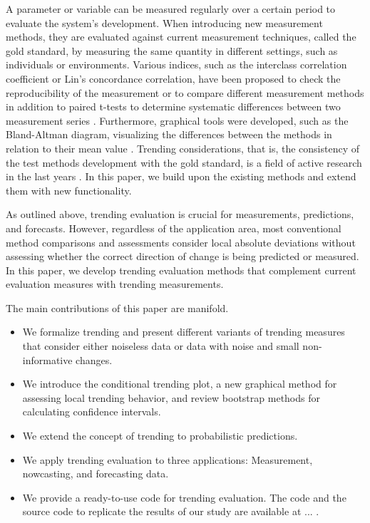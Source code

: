A parameter or variable can be measured regularly over a certain period to evaluate the system's development.
When introducing new measurement methods, they are evaluated against current measurement techniques, called the gold standard, by measuring the same quantity in different settings, such as individuals or environments.
Various indices, such as the interclass correlation coefficient or Lin's concordance correlation, have been proposed to check the reproducibility of the measurement or to compare different measurement methods \parencite{lawrence1989concordance,koo2016guideline} in addition to paired t-tests to determine systematic differences between two measurement series \parencite{watson2010method}. 
Furthermore, graphical tools were developed, such as the Bland-Altman diagram, visualizing the differences between the methods in relation to their mean value \parencite{bland1986statistical}. 
Trending considerations, that is, the consistency of the test methods development with the gold standard, is a field of active research in the last years \parencite{Saugel2015,saugel2018error,hiraishi2021concordance}. 
In this paper, we build upon the existing methods and extend them with new functionality.

As outlined above, trending evaluation is crucial for measurements, predictions, and forecasts. 
However, regardless of the application area, most conventional method comparisons and assessments consider local absolute deviations without assessing whether the correct direction of change is being predicted or measured. 
In this paper, we develop trending evaluation methods that complement current evaluation measures with trending measurements.

The main contributions of this paper are manifold.
\begin{itemize}
\item We formalize trending and present different variants of trending measures that consider either noiseless data or data with noise and small non-informative changes.
\item We introduce the conditional trending plot, a new graphical method for assessing local trending behavior, and review bootstrap methods for calculating confidence intervals.
\item We extend the concept of trending to probabilistic predictions.
\item We apply trending evaluation to three applications: Measurement, nowcasting, and forecasting data. 
\item We provide a ready-to-use code for trending evaluation. The code and the source code to replicate the results of our study are available at ... .
\end{itemize}

